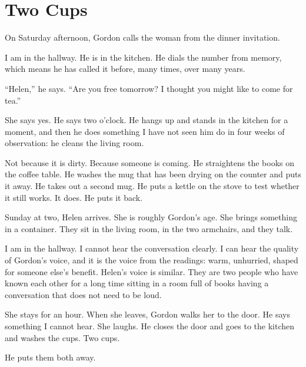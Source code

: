 
\chapter{Two Cups}

On Saturday afternoon, Gordon calls the woman from the dinner invitation.

I am in the hallway. He is in the kitchen. He dials the number from memory, which means he has called it before, many times, over many years.

``Helen,'' he says. ``Are you free tomorrow? I thought you might like to come for tea.''

She says yes. He says two o'clock. He hangs up and stands in the kitchen for a moment, and then he does something I have not seen him do in four weeks of observation: he cleans the living room.

Not because it is dirty. Because someone is coming. He straightens the books on the coffee table. He washes the mug that has been drying on the counter and puts it away. He takes out a second mug. He puts a kettle on the stove to test whether it still works. It does. He puts it back.

Sunday at two, Helen arrives. She is roughly Gordon's age. She brings something in a container. They sit in the living room, in the two armchairs, and they talk.

I am in the hallway. I cannot hear the conversation clearly. I can hear the quality of Gordon's voice, and it is the voice from the readings: warm, unhurried, shaped for someone else's benefit. Helen's voice is similar. They are two people who have known each other for a long time sitting in a room full of books having a conversation that does not need to be loud.

She stays for an hour. When she leaves, Gordon walks her to the door. He says something I cannot hear. She laughs. He closes the door and goes to the kitchen and washes the cups. Two cups.

He puts them both away.
